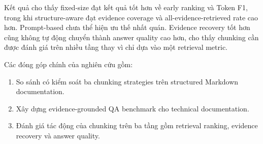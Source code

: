 Kết quả cho thấy fixed-size đạt kết quả tốt hơn về early ranking và Token F1, trong khi structure-aware đạt evidence coverage và all-evidence-retrieved rate cao hơn. Prompt-based chưa thể hiện ưu thế nhất quán. Evidence recovery tốt hơn cũng không tự động chuyển thành answer quality cao hơn, cho thấy chunking cần được đánh giá trên nhiều tầng thay vì chỉ dựa vào một retrieval metric.

Các đóng góp chính của nghiên cứu gồm:

\begin{enumerate}
    \item So sánh có kiểm soát ba chunking strategies trên structured Markdown documentation.
    
    \item Xây dựng evidence-grounded QA benchmark cho technical documentation.
    
    \item Đánh giá tác động của chunking trên ba tầng gồm retrieval ranking, evidence recovery và answer quality.
\end{enumerate}